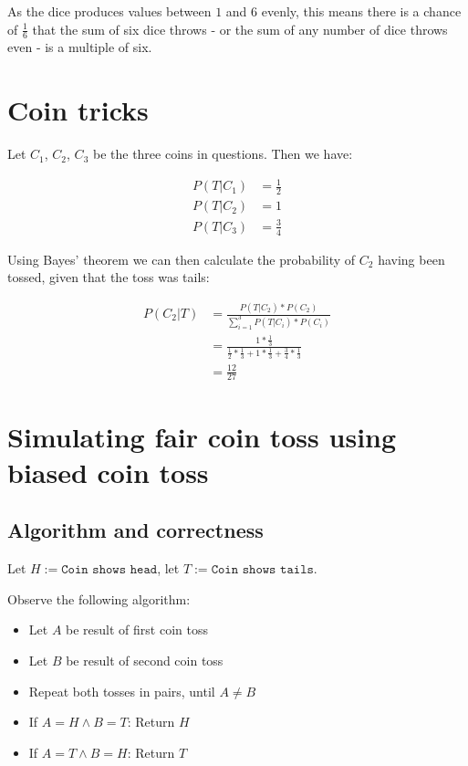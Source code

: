 \documentclass[a4paper]{scrreprt}
\begin{document}
As the dice produces values between $1$ and $6$ evenly, this means there is a
chance of $\frac{1}{6}$ that the sum of six dice throws - or the sum of any
number of dice throws even - is a multiple of six.

\section{Coin tricks}

Let $C_1$, $C_2$, $C_3$ be the three coins in questions. Then we have:

\begin{align*}
	P(T | C_1) & = \frac{1}{2} \\
	P(T | C_2) & = 1 \\
	P(T | C_3) & = \frac{3}{4}
\end{align*}

Using Bayes' theorem we can then calculate the probability of $C_2$ having been
tossed, given that the toss was tails:

\begin{align*}
	P(C_2 | T) & = \frac{P(T | C_2) * P(C_2)}{\sum_{i=1}^3{P(T | C_i) * P(C_i)}} \\
		   & = \frac{1 * \frac{1}{3}}{\frac{1}{2} * \frac{1}{3} + 1 * \frac{1}{3} + \frac{3}{4} * \frac{1}{3}} \\
		   & = \frac{12}{27}
\end{align*}



\section{Simulating fair coin toss using biased coin toss}

\subsection{Algorithm and correctness}

Let $H := \texttt{Coin shows head}$, let $T := \texttt{Coin shows tails}$.

Observe the following algorithm:
\begin{itemize}
	\item Let $A$ be result of first coin toss
	\item Let $B$ be result of second coin toss
	\item Repeat both tosses in pairs, until $A \neq B$
	\item If $A = H \land B = T$: Return $H$
	\item If $A = T \land B = H$: Return $T$
\end{itemize}
\end{document}
